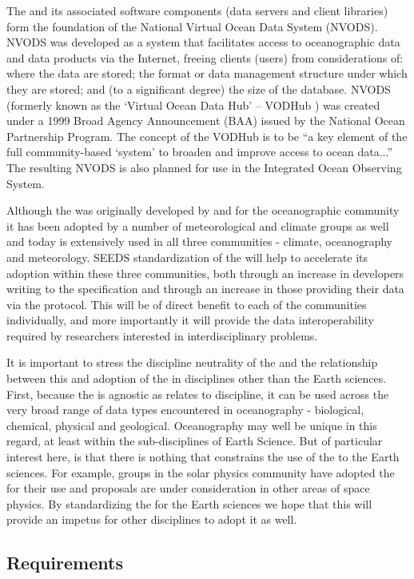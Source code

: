\documentclass[justify]{nasa-ese}
\begin{document}
The \DAP and its associated software components (data servers and client
libraries) form the foundation of the National Virtual Ocean Data System
(NVODS). NVODS was developed as a system that facilitates access to
oceanographic data and data products via the Internet, freeing clients
(users) from considerations of: where the data are stored; the format or data
management structure under which they are stored; and (to a significant
degree) the size of the database. NVODS (formerly known as the `Virtual Ocean
Data Hub' -- VODHub ) was created under a 1999 Broad Agency Announcement
(BAA) issued by the National Ocean Partnership Program. The concept of the
VODHub is to be ``a key element of the full community-based `system' to
broaden and improve access to ocean data...'' The resulting NVODS is also
planned for use in the Integrated Ocean Observing System.

Although the \DAP was originally developed by and for the oceanographic
community it has been adopted by a number of meteorological and climate
groups as well and today is extensively used in all three communities -
climate, oceanography and meteorology. SEEDS standardization of the \DAP will
help to accelerate its adoption within these three communities, both through
an increase in developers writing to the specification and through an
increase in those providing their data via the protocol. This will be of
direct benefit to each of the communities individually, and more importantly
it will provide the data interoperability required by researchers interested
in interdisciplinary problems.

It is important to stress the discipline neutrality of the \DAP and the
relationship between this and adoption of the \DAP in disciplines other than
the Earth sciences. First, because the \DAP is agnostic as relates to
discipline, it can be used across the very broad range of data types
encountered in oceanography - biological, chemical, physical and geological.
Oceanography may well be unique in this regard, at least within the
sub-disciplines of Earth Science. But of particular interest here, is that
there is nothing that constrains the use of the \DAP to the Earth sciences.
For example, groups in the solar physics community have adopted the \DAP for
their use and proposals are under consideration in other areas of space
physics. By standardizing the \DAP for the Earth sciences we hope that this
will provide an impetus for other disciplines to adopt it as well.
 
\subsection{Requirements}
\end{document}
